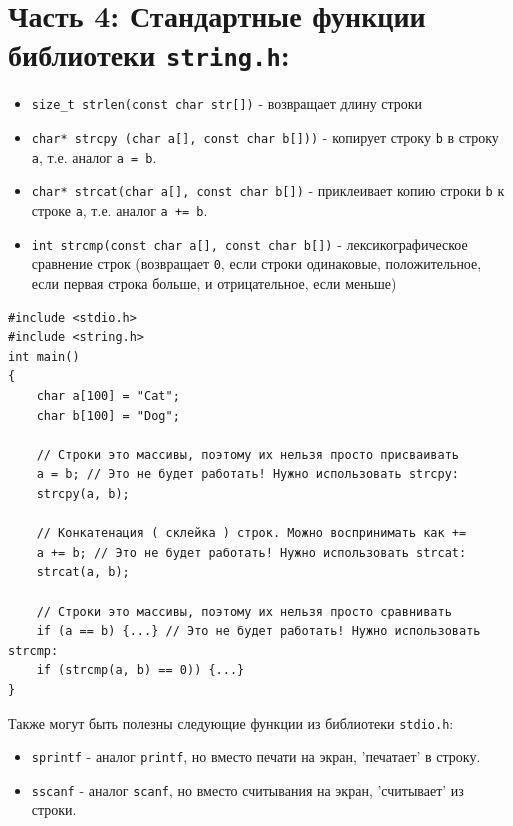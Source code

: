 \documentclass{article}
\begin{document}
\section*{Часть 4: Стандартные функции библиотеки \texttt{string.h}:}
\begin{itemize}
\item \texttt{size\_t strlen(const char str[])} - возвращает длину строки
\item \texttt{char* strcpy (char a[], const char b[]))} - копирует строку \texttt{b} в строку \texttt{a}, т.е. аналог \texttt{a = b}.
\item \texttt{char* strcat(char a[], const char b[])} - приклеивает копию строки \texttt{b} к строке \texttt{a}, т.е. аналог \texttt{a += b}.
\item \texttt{int strcmp(const char a[], const char b[])} - лексикографическое сравнение строк (возвращает \texttt{0}, если строки одинаковые, положительное, если первая строка больше, и отрицательное, если меньше)
\end{itemize}
\begin{lstlisting}
#include <stdio.h>
#include <string.h>
int main() 
{
    char a[100] = "Cat";
    char b[100] = "Dog";
	
    // Строки это массивы, поэтому их нельзя просто присваивать 
    a = b; // Это не будет работать! Нужно использовать strcpy:
    strcpy(a, b);
    
    // Конкатенация ( склейка ) строк. Можно воспринимать как +=
    a += b; // Это не будет работать! Нужно использовать strcat:
    strcat(a, b);
	
    // Строки это массивы, поэтому их нельзя просто сравнивать
    if (a == b) {...} // Это не будет работать! Нужно использовать strcmp:
    if (strcmp(a, b) == 0)) {...} 
}
\end{lstlisting}


Также могут быть полезны следующие функции из библиотеки \texttt{stdio.h}:
\begin{itemize}
\item \texttt{sprintf} - аналог \texttt{printf}, но вместо печати на экран, 'печатает' в строку.
\item \texttt{sscanf} - аналог \texttt{scanf}, но вместо считывания на экран, 'считывает' из строки.
\end{itemize}


\newpage
\end{document}
